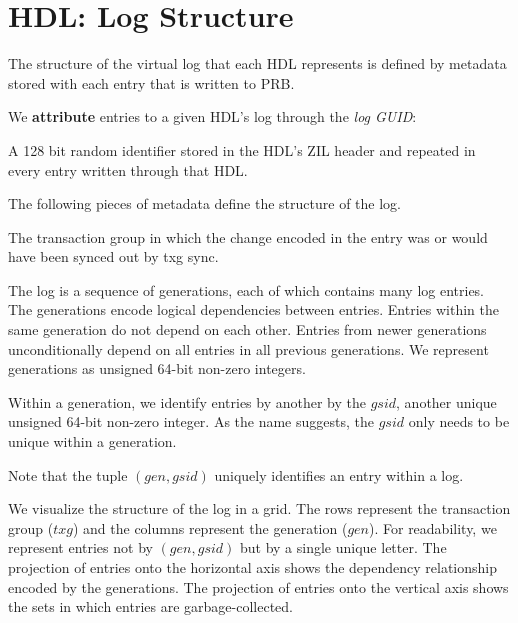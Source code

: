 \documentclass[12pt,a4paper,twoside]{book}
\begin{document}
\section{HDL: Log Structure}\label{di:prb:logstructure}
The structure of the virtual log that each HDL represents is defined by metadata stored with each entry that is written to PRB.

We \textbf{attribute} entries to a given HDL's log through the \textit{log GUID}:
\begin{description}[noitemsep,leftmargin=1.5cm,labelindent=1cm]
    \item[Log GUID] A 128 bit random identifier stored in the HDL's ZIL header and repeated in every entry written through that HDL.
\end{description}

The following pieces of metadata define the structure of the log.
\begin{description}[noitemsep,leftmargin=1.5cm,labelindent=1cm]
    \item[Transaction Group (txg)] The transaction group in which the change encoded in the entry was or would have been synced out by txg sync.
    \item[Generation Number (gen)] The log is a sequence of generations, each of which contains many log entries.
        The generations encode logical dependencies between entries.
        Entries within the same generation do not depend on each other.
        Entries from newer generations unconditionally depend on all entries in all previous generations.
        We represent generations as unsigned 64-bit non-zero integers.
    \item[Generation-Scoped ID (gsid)] Within a generation, we identify entries by another by the $gsid$, another unique unsigned 64-bit non-zero integer.
        As the name suggests, the $gsid$ only needs to be unique within a generation.
\end{description}
Note that the tuple $(gen, gsid)$ uniquely identifies an entry within a log.

We visualize the structure of the log in a grid.
The rows represent the transaction group ($txg$) and the columns represent the generation ($gen$).
For readability, we represent entries not by $(gen, gsid)$ but by a single unique letter.
The projection of entries onto the horizontal axis shows the dependency relationship encoded by the generations.
The projection of entries onto the vertical axis shows the sets in which entries are garbage-collected.
\end{document}
